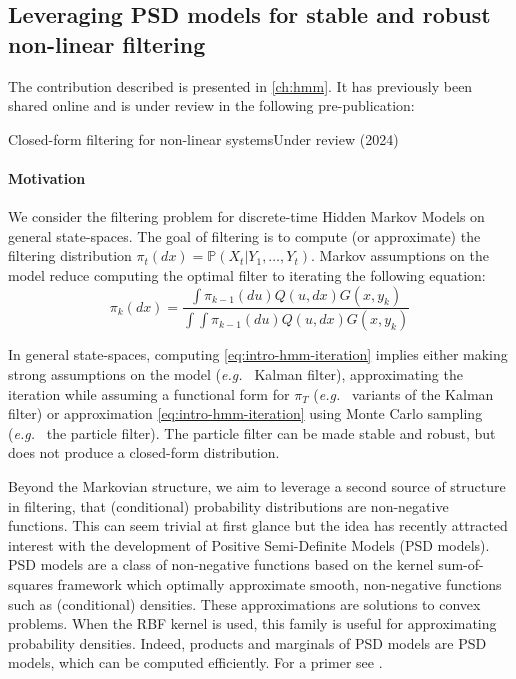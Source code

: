 \subsection{Leveraging PSD models for stable and robust non-linear filtering}
\begin{mdframed}
The contribution described is presented in \cref{ch:hmm}.
\noindent It has previously been shared online and is under review in the following pre-publication:
\begin{mdframed}
{Closed-form filtering for non-linear systems}{Under review (2024)}
\end{mdframed}
\end{mdframed}

\paragraph{Motivation}
We consider the filtering problem for discrete-time Hidden Markov Models on general state-spaces. The goal of filtering is to compute (or approximate) the filtering distribution $\pi_t(dx) = \mathbb P(X_t\vert Y_1, \ldots, Y_{t})$. Markov assumptions on the model reduce computing the optimal filter to iterating the following equation:
\begin{equation}\label{eq:intro-hmm-iteration}
\pi_k(dx) = \frac{\int \pi_{k-1}(du)Q(u, dx)G(x, y_k)}{\int \int \pi_{k-1}(du)Q(u, dx)G(x, y_k)}
\end{equation}

In general state-spaces, computing \cref{eq:intro-hmm-iteration} implies either making strong assumptions on the model (\emph{e.g.\ } Kalman filter), approximating the iteration while assuming a functional form for $\pi_T$ (\emph{e.g.\ } variants of the Kalman filter) or approximation \cref{eq:intro-hmm-iteration} using Monte Carlo sampling (\emph{e.g.\ } the particle filter). The particle filter can be made stable and robust, but does not produce a closed-form distribution.

Beyond the Markovian structure, we aim to leverage a second source of structure in filtering, that (conditional) probability distributions are non-negative functions. This can seem trivial at first glance but the idea has recently attracted interest with the development of Positive Semi-Definite Models (PSD models). PSD models are a class of non-negative functions based on the kernel sum-of-squares framework which optimally approximate smooth, non-negative functions such as (conditional) densities. These approximations are solutions to convex problems. When the RBF kernel is used, this family is useful for approximating probability densities. Indeed, products and marginals of PSD models are PSD models, which can be computed efficiently. For a primer see \citep{ciliberto2021,ulysse-sampling}.



